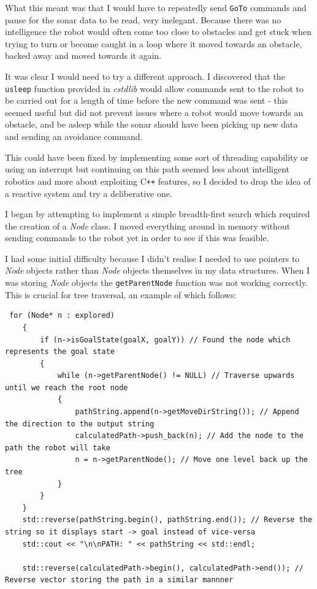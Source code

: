 \documentclass[a4paper,12pt]{article}
\begin{document}
What this meant was that I would have to repeatedly send \texttt{GoTo} commands and pause for the sonar data to be read, very inelegant. Because there was no intelligence the robot would often come too close to obstacles and get stuck when trying to turn or become caught in a loop where it moved towards an obstacle, backed away and moved towards it again.

It was clear I would need to try a different approach. I discovered that the \texttt{usleep} function provided in \textit{cstdlib} would allow commands sent to the robot to be carried out for a length of time before the new command was sent - this seemed useful but did not prevent issues where a robot would move towards an obstacle, and be asleep while the sonar should have been picking up new data and sending an avoidance command.

This could have been fixed by implementing some sort of threading capability or using an interrupt but continuing on this path seemed less about intelligent robotics and more about exploiting C\texttt{++} features, so I decided to drop the idea of a reactive system and try a deliberative one.

I began by attempting to implement a simple breadth-first search which required the creation of a \textit{Node} class. I moved everything around in memory without sending commands to the robot yet in order to see if this was feasible. 

I had some initial difficulty because I didn't realise I needed to use pointers to \textit{Node} objects rather than \textit{Node} objects themselves in my data structures. When I was storing \textit{Node} objects the \texttt{getParentNode} function was not working correctly. This is crucial for tree traversal, an example of which follows:

\begin{lstlisting}
 for (Node* n : explored)
    {
        if (n->isGoalState(goalX, goalY)) // Found the node which represents the goal state
        {
            while (n->getParentNode() != NULL) // Traverse upwards until we reach the root node 
            {
                pathString.append(n->getMoveDirString()); // Append the direction to the output string
                calculatedPath->push_back(n); // Add the node to the path the robot will take
                n = n->getParentNode(); // Move one level back up the tree
            }
        }
    }
    std::reverse(pathString.begin(), pathString.end()); // Reverse the string so it displays start -> goal instead of vice-versa
    std::cout << "\n\nPATH: " << pathString << std::endl;

    std::reverse(calculatedPath->begin(), calculatedPath->end()); // Reverse vector storing the path in a similar mannner
\end{lstlisting}
\end{document}
